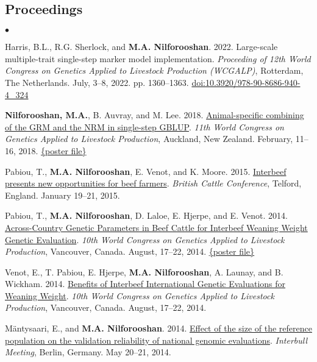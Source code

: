 \documentclass[margin,line]{res}
\newenvironment{list2}{
  \begin{list}{$\bullet$}{%
      \setlength{\itemsep}{0in}
      \setlength{\parsep}{0in} \setlength{\parskip}{0in}
      \setlength{\topsep}{0in} \setlength{\partopsep}{0in}
      \setlength{\leftmargin}{0.2in}}}{\end{list}}
\begin{document}
\begin{resume}
\section{\sc Proceedings}

\begin{list2}
\item Harris, B.L., R.G. Sherlock, and {\bf M.A. Nilforooshan}. 2022. Large-scale multiple-trait single-step marker model implementation. {\em Proceeding of 12th World Congress on Genetics Applied to Livestock Production (WCGALP)}, Rotterdam, The Netherlands. July, 3--8, 2022. pp. 1360--1363. \href{https://doi.org/10.3920/978-90-8686-940-4_324}{doi:10.3920/978-90-8686-940-4\_324}
\item {\bf Nilforooshan, M.A.}, B. Auvray, and M. Lee. 2018. \href{https://www.researchgate.net/publication/358198782_Animal-specific_combining_of_the_GRM_and_the_NRM_in_single-step_GBLUP}{Animal-specific combining of the GRM and the NRM in single-step GBLUP}. {\em 11th World Congress on Genetics Applied to Livestock Production}, Auckland, New Zealand. February, 11--16, 2018. \href{https://doi.org/10.13140/RG.2.2.25768.03843}{\{poster file\}}
\item Pabiou, T., {\bf M.A. Nilforooshan}, E. Venot, and  K. Moore. 2015. \href{https://www.researchgate.net/publication/358198790_Interbeef_presents_new_opportunities_for_beef_farmers}{Interbeef presents new opportunities for beef farmers}. {\em British Cattle Conference}, Telford, England. January 19--21, 2015.
\item Pabiou, T., {\bf M.A. Nilforooshan}, D. Laloe, E. Hjerpe, and E. Venot. 2014. \href{https://www.researchgate.net/publication/268110020_ACROSS-COUNTRY_GENETIC_PARAMETERS_IN_BEEF_CATTLE_FOR_INTERBEEF_WEANING_WEIGHT_GENETIC_EVALUATION}{Across-Country Genetic Parameters in Beef Cattle for Interbeef Weaning Weight Genetic Evaluation}. {\em 10th World Congress on Genetics Applied to Livestock Production}, Vancouver, Canada. August, 17--22, 2014. \href{http://dx.doi.org/10.13140/RG.2.2.33036.80003}{\{poster file\}}
\item Venot, E., T. Pabiou, E. Hjerpe, {\bf M.A. Nilforooshan}, A. Launay, and B. Wickham. 2014. \href{https://www.researchgate.net/publication/268109933_Benefits_of_Interbeef_international_genetic_evaluations_for_weaning_weight}{Benefits of Interbeef International Genetic Evaluations for Weaning Weight}. {\em 10th World Congress on Genetics Applied to Livestock Production}, Vancouver, Canada. August, 17--22, 2014.
\item M\"{a}ntysaari, E., and {\bf M.A. Nilforooshan}. 2014. \href{https://drive.google.com/file/d/0B2l_izQwJmVpY3B1dTRtMmlWV1E/view?usp=sharing&resourcekey=0-noBm5g1J1txJWu7nFhvD1A}{Effect of the size of the reference population on the validation reliability of national genomic evaluations}. {\em Interbull Meeting}, Berlin, Germany. May 20--21, 2014.

\end{list2}
\end{resume}
\end{document}

